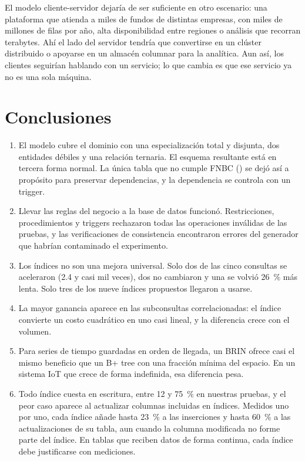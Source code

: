El modelo cliente-servidor dejaría de ser suficiente en otro escenario: una plataforma que atienda a miles de fundos de distintas empresas, con miles de millones de filas por año, alta disponibilidad entre regiones o análisis que recorran terabytes. Ahí el lado del servidor tendría que convertirse en un clúster distribuido o apoyarse en un almacén columnar para la analítica. Aun así, los clientes seguirían hablando con un servicio; lo que cambia es que ese servicio ya no es una sola máquina.

\section{Conclusiones}

\begin{enumerate}[leftmargin=1.6em,itemsep=0.25em]
\item El modelo cubre el dominio con una especialización total y disjunta, dos entidades débiles y una relación ternaria. El esquema resultante está en tercera forma normal. La única tabla que no cumple FNBC () se dejó así a propósito para preservar dependencias, y la dependencia se controla con un trigger.
\item Llevar las reglas del negocio a la base de datos funcionó. Restricciones, procedimientos y triggers rechazaron todas las operaciones inválidas de las pruebas, y las verificaciones de consistencia encontraron errores del generador que habrían contaminado el experimento.
\item Los índices no son una mejora universal. Solo dos de las cinco consultas se aceleraron (2.4 y casi mil veces), dos no cambiaron y una se volvió 26~\% más lenta. Solo tres de los nueve índices propuestos llegaron a usarse.
\item La mayor ganancia aparece en las subconsultas correlacionadas: el índice convierte un costo cuadrático en uno casi lineal, y la diferencia crece con el volumen.
\item Para series de tiempo guardadas en orden de llegada, un BRIN ofrece casi el mismo beneficio que un B+ tree con una fracción mínima del espacio. En un sistema IoT que crece de forma indefinida, esa diferencia pesa.
\item Todo índice cuesta en escritura, entre 12 y 75~\% en nuestras pruebas, y el peor caso aparece al actualizar columnas incluidas en índices. Medidos uno por uno, cada índice añade hasta 23~\% a las inserciones y hasta 60~\% a las actualizaciones de su tabla, aun cuando la columna modificada no forme parte del índice. En tablas que reciben datos de forma continua, cada índice debe justificarse con mediciones.

\end{enumerate}
